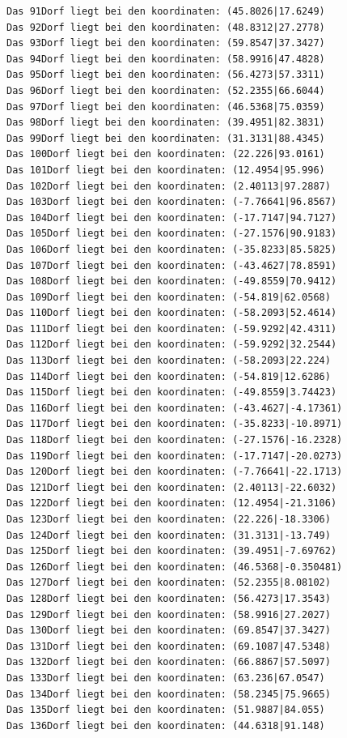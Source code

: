 \documentclass{article}
\begin{document}
\begin{verbatim}
Das 91Dorf liegt bei den koordinaten: (45.8026|17.6249)
Das 92Dorf liegt bei den koordinaten: (48.8312|27.2778)
Das 93Dorf liegt bei den koordinaten: (59.8547|37.3427)
Das 94Dorf liegt bei den koordinaten: (58.9916|47.4828)
Das 95Dorf liegt bei den koordinaten: (56.4273|57.3311)
Das 96Dorf liegt bei den koordinaten: (52.2355|66.6044)
Das 97Dorf liegt bei den koordinaten: (46.5368|75.0359)
Das 98Dorf liegt bei den koordinaten: (39.4951|82.3831)
Das 99Dorf liegt bei den koordinaten: (31.3131|88.4345)
Das 100Dorf liegt bei den koordinaten: (22.226|93.0161)
Das 101Dorf liegt bei den koordinaten: (12.4954|95.996)
Das 102Dorf liegt bei den koordinaten: (2.40113|97.2887)
Das 103Dorf liegt bei den koordinaten: (-7.76641|96.8567)
Das 104Dorf liegt bei den koordinaten: (-17.7147|94.7127)
Das 105Dorf liegt bei den koordinaten: (-27.1576|90.9183)
Das 106Dorf liegt bei den koordinaten: (-35.8233|85.5825)
Das 107Dorf liegt bei den koordinaten: (-43.4627|78.8591)
Das 108Dorf liegt bei den koordinaten: (-49.8559|70.9412)
Das 109Dorf liegt bei den koordinaten: (-54.819|62.0568)
Das 110Dorf liegt bei den koordinaten: (-58.2093|52.4614)
Das 111Dorf liegt bei den koordinaten: (-59.9292|42.4311)
Das 112Dorf liegt bei den koordinaten: (-59.9292|32.2544)
Das 113Dorf liegt bei den koordinaten: (-58.2093|22.224)
Das 114Dorf liegt bei den koordinaten: (-54.819|12.6286)
Das 115Dorf liegt bei den koordinaten: (-49.8559|3.74423)
Das 116Dorf liegt bei den koordinaten: (-43.4627|-4.17361)
Das 117Dorf liegt bei den koordinaten: (-35.8233|-10.8971)
Das 118Dorf liegt bei den koordinaten: (-27.1576|-16.2328)
Das 119Dorf liegt bei den koordinaten: (-17.7147|-20.0273)
Das 120Dorf liegt bei den koordinaten: (-7.76641|-22.1713)
Das 121Dorf liegt bei den koordinaten: (2.40113|-22.6032)
Das 122Dorf liegt bei den koordinaten: (12.4954|-21.3106)
Das 123Dorf liegt bei den koordinaten: (22.226|-18.3306)
Das 124Dorf liegt bei den koordinaten: (31.3131|-13.749)
Das 125Dorf liegt bei den koordinaten: (39.4951|-7.69762)
Das 126Dorf liegt bei den koordinaten: (46.5368|-0.350481)
Das 127Dorf liegt bei den koordinaten: (52.2355|8.08102)
Das 128Dorf liegt bei den koordinaten: (56.4273|17.3543)
Das 129Dorf liegt bei den koordinaten: (58.9916|27.2027)
Das 130Dorf liegt bei den koordinaten: (69.8547|37.3427)
Das 131Dorf liegt bei den koordinaten: (69.1087|47.5348)
Das 132Dorf liegt bei den koordinaten: (66.8867|57.5097)
Das 133Dorf liegt bei den koordinaten: (63.236|67.0547)
Das 134Dorf liegt bei den koordinaten: (58.2345|75.9665)
Das 135Dorf liegt bei den koordinaten: (51.9887|84.055)
Das 136Dorf liegt bei den koordinaten: (44.6318|91.148)

\end{verbatim}
\end{document}
